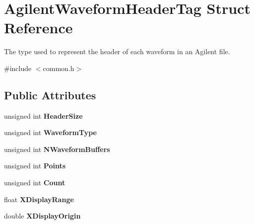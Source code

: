 \hypertarget{structAgilentWaveformHeaderTag}{
\section{AgilentWaveformHeaderTag Struct Reference}
\label{structAgilentWaveformHeaderTag}
}


The type used to represent the header of each waveform in an Agilent file.  




{\ttfamily \#include $<$common.h$>$}

\subsection*{Public Attributes}
\begin{DoxyCompactItemize}
\item 
\hypertarget{structAgilentWaveformHeaderTag_a6c3d17169dffda90ed9c59bca1cc9165}{
unsigned int {\bfseries HeaderSize}}
\label{structAgilentWaveformHeaderTag_a6c3d17169dffda90ed9c59bca1cc9165}

\item 
\hypertarget{structAgilentWaveformHeaderTag_ade0936196349021e99fe67072fbb488d}{
unsigned int {\bfseries WaveformType}}
\label{structAgilentWaveformHeaderTag_ade0936196349021e99fe67072fbb488d}

\item 
\hypertarget{structAgilentWaveformHeaderTag_aeeaef749ad475eae710ea1f83484caa4}{
unsigned int {\bfseries NWaveformBuffers}}
\label{structAgilentWaveformHeaderTag_aeeaef749ad475eae710ea1f83484caa4}

\item 
\hypertarget{structAgilentWaveformHeaderTag_a866458580fa6429c2aa5fe680de5392f}{
unsigned int {\bfseries Points}}
\label{structAgilentWaveformHeaderTag_a866458580fa6429c2aa5fe680de5392f}

\item 
\hypertarget{structAgilentWaveformHeaderTag_a8829f0d5fa4b7cd5b4646de60b418702}{
unsigned int {\bfseries Count}}
\label{structAgilentWaveformHeaderTag_a8829f0d5fa4b7cd5b4646de60b418702}

\item 
\hypertarget{structAgilentWaveformHeaderTag_a277d3cd0656a5ac8f080e81eb9f2f767}{
float {\bfseries XDisplayRange}}
\label{structAgilentWaveformHeaderTag_a277d3cd0656a5ac8f080e81eb9f2f767}

\item 
\hypertarget{structAgilentWaveformHeaderTag_afa3d706fad873677589c4b2f7146155f}{
double {\bfseries XDisplayOrigin}}
\label{structAgilentWaveformHeaderTag_afa3d706fad873677589c4b2f7146155f}


\end{DoxyCompactItemize}
